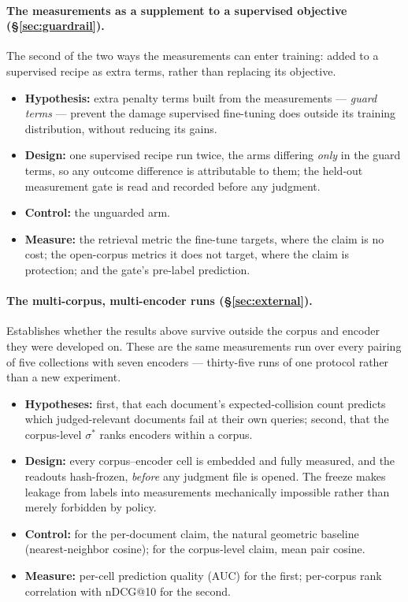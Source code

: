 \documentclass[11pt,letterpaper]{article}
\newcommand{\sstar}{\sigma^{*}}
\begin{document}
\paragraph{The measurements as a supplement to a supervised objective
(\S\ref{sec:guardrail}).}
The second of the two ways the measurements can enter training: added to
a supervised recipe as extra terms, rather than replacing its objective.
\begin{itemize}
  \item \textbf{Hypothesis:} extra penalty terms built from the
measurements --- \emph{guard terms} --- prevent the damage
supervised fine-tuning does outside its training distribution, without
reducing its gains.
  \item \textbf{Design:} one supervised
recipe run twice, the arms differing \emph{only} in the guard terms, so
any outcome difference is attributable to them; the held-out measurement
gate is read and recorded before any judgment.
  \item \textbf{Control:} the unguarded
arm.
  \item \textbf{Measure:} the retrieval metric the fine-tune targets, where the claim is no
cost; the open-corpus metrics it does not target, where the claim is
protection; and the gate's pre-label prediction.
\end{itemize}


\paragraph{The multi-corpus, multi-encoder runs (\S\ref{sec:external}).}
Establishes whether the results above survive outside the corpus and
encoder they were developed on. These are the same measurements run
over every pairing of five collections with seven encoders ---
thirty-five runs of one protocol rather than a new experiment.
\begin{itemize}
  \item \textbf{Hypotheses:} first, that
each document's expected-collision count predicts which judged-relevant
documents fail at their own queries; second, that the corpus-level
$\sstar$ ranks encoders within a corpus.
  \item \textbf{Design:} every corpus--encoder cell is embedded and fully measured, and the
readouts hash-frozen, \emph{before} any judgment file is opened. The
freeze makes leakage from labels into measurements mechanically
impossible rather than merely forbidden by policy.
  \item \textbf{Control:} for the per-document claim, the natural geometric baseline
(nearest-neighbor cosine); for the corpus-level claim, mean pair cosine.
  \item \textbf{Measure:} per-cell prediction quality (AUC) for the first; per-corpus rank
correlation with nDCG@10 for the second.
\end{itemize}

\end{document}
